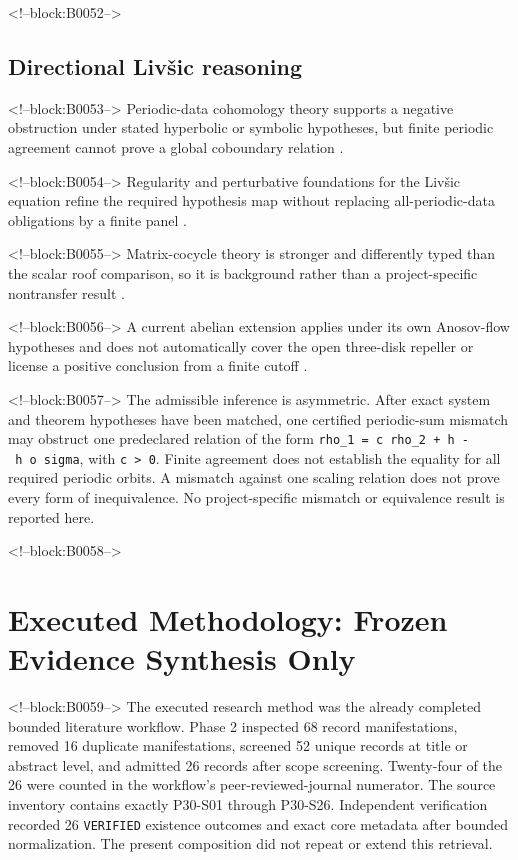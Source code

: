 \documentclass[11pt,a4paper]{article}
\begin{document}
<!--block:B0052-->
\subsection{Directional Livšic reasoning}

<!--block:B0053-->
Periodic-data cohomology theory supports a negative obstruction under stated hyperbolic or symbolic hypotheses, but finite periodic agreement cannot prove a global coboundary relation
\citep{P30-S23}.

<!--block:B0054-->
Regularity and perturbative foundations for the Livšic equation refine the required hypothesis map without replacing all-periodic-data obligations by a finite panel
\citep{P30-S24}.

<!--block:B0055-->
Matrix-cocycle theory is stronger and differently typed than the scalar roof comparison, so it is background rather than a project-specific nontransfer result
\citep{P30-S25}.

<!--block:B0056-->
A current abelian extension applies under its own Anosov-flow hypotheses and does not automatically cover the open three-disk repeller or license a positive conclusion from a finite cutoff
\citep{P30-S26}.

<!--block:B0057-->
The admissible inference is asymmetric. After exact system and theorem hypotheses have been matched, one certified periodic-sum mismatch may obstruct one predeclared relation of the form \texttt{rho\_1\ =\ c\ rho\_2\ +\ h\ -\ h\ o\ sigma}, with \texttt{c\ \textgreater{}\ 0}. Finite agreement does not establish the equality for all required periodic orbits. A mismatch against one scaling relation does not prove every form of inequivalence. No project-specific mismatch or equivalence result is reported here.

<!--block:B0058-->
\section{Executed Methodology: Frozen Evidence Synthesis Only}

<!--block:B0059-->
The executed research method was the already completed bounded literature workflow. Phase 2 inspected 68 record manifestations, removed 16 duplicate manifestations, screened 52 unique records at title or abstract level, and admitted 26 records after scope screening. Twenty-four of the 26 were counted in the workflow's peer-reviewed-journal numerator. The source inventory contains exactly P30-S01 through P30-S26. Independent verification recorded 26 \texttt{VERIFIED} existence outcomes and exact core metadata after bounded normalization. The present composition did not repeat or extend this retrieval.
\end{document}
